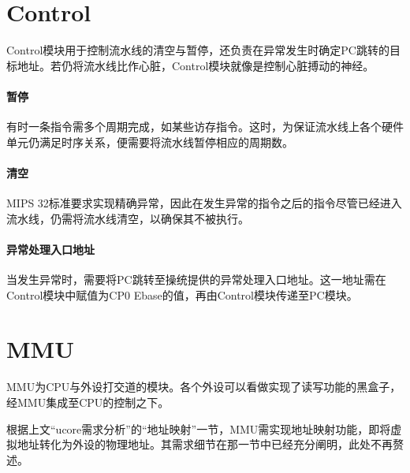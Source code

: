 \section{Control}

Control模块用于控制流水线的清空与暂停，还负责在异常发生时确定PC跳转的目标地址。若仍将流水线比作心脏，Control模块就像是控制心脏搏动的神经。

\paragraph{暂停} 有时一条指令需多个周期完成，如某些访存指令。这时，为保证流水线上各个硬件单元仍满足时序关系，便需要将流水线暂停相应的周期数。
\paragraph{清空} MIPS 32标准要求实现精确异常，因此在发生异常的指令之后的指令尽管已经进入流水线，仍需将流水线清空，以确保其不被执行。
\paragraph{异常处理入口地址} 当发生异常时，需要将PC跳转至操统提供的异常处理入口地址。这一地址需在Control模块中赋值为CP0 Ebase的值，再由Control模块传递至PC模块。

\section{MMU}

MMU为CPU与外设打交道的模块。各个外设可以看做实现了读写功能的黑盒子，经MMU集成至CPU的控制之下。

根据上文``ucore需求分析''的``地址映射''一节，MMU需实现地址映射功能，即将虚拟地址转化为外设的物理地址。其需求细节在那一节中已经充分阐明，此处不再赘述。
